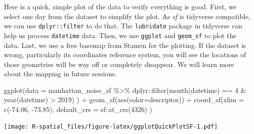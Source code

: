 \documentclass[
  11pt,
]{book}
\newenvironment{Shaded}{\begin{snugshade}}{\end{snugshade}}
\newcommand{\AttributeTok}[1]{\textcolor[rgb]{0.77,0.63,0.00}{#1}}
\newcommand{\DecValTok}[1]{\textcolor[rgb]{0.00,0.00,0.81}{#1}}
\newcommand{\FloatTok}[1]{\textcolor[rgb]{0.00,0.00,0.81}{#1}}
\newcommand{\FunctionTok}[1]{\textcolor[rgb]{0.00,0.00,0.00}{#1}}
\newcommand{\NormalTok}[1]{#1}
\newcommand{\SpecialCharTok}[1]{\textcolor[rgb]{0.00,0.00,0.00}{#1}}
\begin{document}
Here is a quick, simple plot of the data to verify everything is good. First, we select one day from the dataset to simplify the plot. As \emph{sf} is tidyverse compatible, we can use \texttt{dplyr::filter} to do that. The \texttt{lubridate} package in tidyverse can help us process \texttt{datetime} data. Then, we use \texttt{ggplot} and \texttt{geom\_sf} to plot the data. Last, we use a free basemap from Stamen for the plotting. If the dataset is wrong, particularly its coordinates reference system, you will see the locations of those geometries will be way off or completely disappear. We will learn more about the mapping in future sessions.

\begin{Shaded}
\begin{Highlighting}[]
\FunctionTok{ggplot}\NormalTok{(}\AttributeTok{data =}\NormalTok{ manhattan\_noise\_sf  }\SpecialCharTok{\%\textgreater{}\%} 
\NormalTok{         dplyr}\SpecialCharTok{::}\FunctionTok{filter}\NormalTok{(}\FunctionTok{month}\NormalTok{(datetime) }\SpecialCharTok{==} \DecValTok{4} \SpecialCharTok{\&} \FunctionTok{year}\NormalTok{(datetime) }\SpecialCharTok{\textgreater{}} \DecValTok{2019}\NormalTok{) ) }\SpecialCharTok{+}
  \FunctionTok{geom\_sf}\NormalTok{(}\FunctionTok{aes}\NormalTok{(}\AttributeTok{color=}\NormalTok{descriptor)) }\SpecialCharTok{+}
  \FunctionTok{coord\_sf}\NormalTok{(}\AttributeTok{xlim =} \FunctionTok{c}\NormalTok{(}\SpecialCharTok{{-}}\FloatTok{74.06}\NormalTok{, }\SpecialCharTok{{-}}\FloatTok{73.85}\NormalTok{), }\AttributeTok{default\_crs =}\NormalTok{ sf}\SpecialCharTok{::}\FunctionTok{st\_crs}\NormalTok{(}\DecValTok{4326}\NormalTok{) )}
\end{Highlighting}
\end{Shaded}

\texttt{[image: R-spatial\_files/figure-latex/ggplotQuickPlotSF-1.pdf]}
\end{document}
